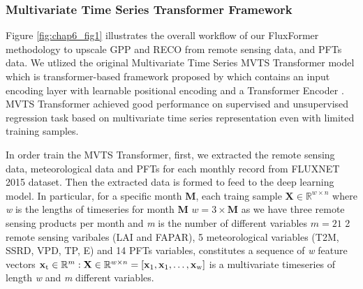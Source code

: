 \subsubsection*{Multivariate Time Series Transformer Framework}
Figure \ref{fig:chap6_fig1} illustrates the overall workflow of our FluxFormer methodology to upscale GPP and RECO from remote sensing data, and PFTs data. We utlized the original Multivariate Time Series MVTS Transformer model which is transformer-based framework proposed by \citep{zerveas2021transformer} which contains an input encoding layer with learnable positional encoding and a Transformer Encoder \citep{vaswani2017attention}. MVTS Transformer achieved good performance on supervised and unsupervised regression task based on multivariate time series representation even with limited training samples.  \par
In order train the MVTS Transformer, first, we extracted the remote sensing data, meteorological data and PFTs for each monthly record from FLUXNET 2015 dataset. Then the extracted data is formed to feed to the deep learning model. In particular, for a specific month \textbf{M}, each traing sample $\mathbf{X} \in \mathbb{R}^{w\times n}$ where \textit{w} is the lengths of timeseries for month \textbf{M} $\textit{w} = 3\times \textbf{M}$ as we have three remote sensing products per month and \textit{m} is the number of different variables  $\textit{m} = 21$ 2 remote sensing varibales (LAI and FAPAR), 5 meteorological variables (T2M, SSRD, VPD, TP, E) and 14 PFTs variables, constitutes a sequence of \textit{w} feature vectors $\mathbf{x}\textsubscript{t} \in \mathbb{R}^{m}: \mathbf{X} \in \mathbb{R}^{w\times n} = [\mathbf{x}\textsubscript{1},\mathbf{x}\textsubscript{1}, \dots, \mathbf{x}\textsubscript{w}]$ is a multivariate timeseries of length \textit{w} and \textit{m} different variables. \par

